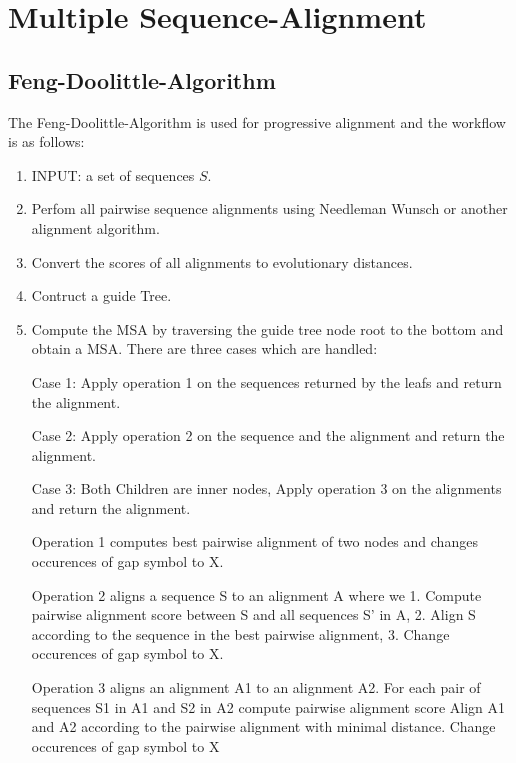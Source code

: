 \section{Multiple Sequence-Alignment}
\label{sec:multi_alignment}

%

\subsection{Feng-Doolittle-Algorithm}
\label{sec:feng_doolittle}
The Feng-Doolittle-Algorithm is used for progressive alignment and the workflow is as follows:
\begin{enumerate}
  \item INPUT: a set of sequences $S$.
  \item Perfom all pairwise sequence alignments using Needleman Wunsch or another alignment algorithm.
  \item Convert the scores of all alignments to evolutionary distances.
  \item Contruct a guide Tree.
  \item Compute the MSA by traversing the guide tree node root to the bottom
        and obtain a MSA. There are three cases which are handled:

        Case 1: Apply operation 1 on the sequences returned by the leafs and return the alignment.

        Case 2: Apply operation 2 on the sequence and the alignment and return the alignment.

        Case 3: Both Children are inner nodes, Apply operation 3 on the alignments and return the alignment.

        Operation 1 computes best pairwise alignment of two nodes and changes occurences of gap symbol to X.

        Operation 2 aligns a sequence S to an alignment A where we
        1. Compute pairwise alignment score between S and all sequences S' in A,
        2. Align S according to the sequence in the best pairwise alignment,
        3. Change occurences of gap symbol to X.

        Operation 3 aligns an alignment A1 to an alignment A2.
        For each pair of sequences S1 in A1 and S2 in A2 compute pairwise alignment score
        Align A1 and A2 according to the pairwise alignment with minimal distance.
        Change occurences of gap symbol to X

\end{enumerate}
